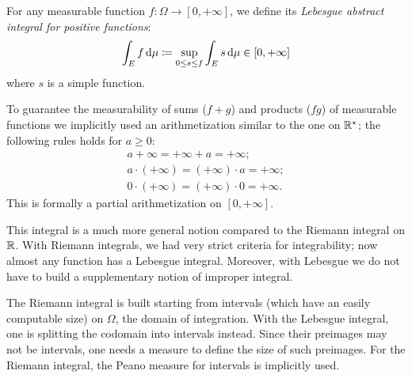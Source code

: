 \begin{defn}
	For any measurable function $f:\Omega\to[0,+\infty]$, we define its
	\emph{Lebesgue abstract integral for positive functions}:
	$$
		\int_E f \,\mathrm d\mu 
		\coloneqq \sup\limits_{0\le s\le f} \int_E s \,\mathrm d\mu 
		\in [0, +\infty]
	$$
	where $s$ is a simple function.
\end{defn}
To guarantee the measurability of sums ($f+g$) and products ($fg$) of measurable functions we implicitly used an arithmetization similar to the one on $\mathbb R^\star$; the following rules holds for $a \geq 0$:
\begin{gather*}
	a + \infty = + \infty + a = + \infty;\\
	a \cdot (+ \infty) = (+ \infty) \cdot a = +\infty;\\
	0 \cdot (+ \infty) = (+ \infty) \cdot 0 = +\infty.
\end{gather*}
This is formally a partial arithmetization on $[0, +\infty]$.

This integral is a much more general notion compared to the Riemann integral on $\mathbb R$.
With Riemann integrals, we had very strict criteria for integrability;
now almost any function has a Lebesgue integral.
Moreover, with Lebesgue we do not have to build a supplementary notion of improper integral.

The Riemann integral is built starting from intervals (which have an easily
computable size) on $\Omega$, the domain of integration. With the Lebesgue
integral, one is splitting the codomain into intervals instead. Since their
preimages may not be intervals, one needs a measure to define the size of
such preimages. For the Riemann integral, the Peano measure for intervals 
is implicitly used.

